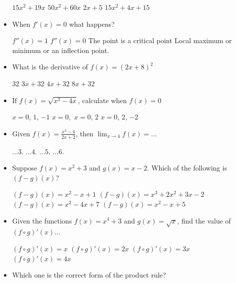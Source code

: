 \documentclass{exam}
\begin{document}
\begin{itemize}
	\begin{choices}
		\choice $15 x^{2} + 19 x$
		\choice $50 x^{2} + 60 x$
		\choice $2 x + 5$
		\CorrectChoice $15 x^{2} + 4 x + 15$
	\end{choices}
	\item When $f'(x) = 0$ what happens?

	\begin{choices}
		\choice $f''(x) = 1$
		\choice $f''(x) = 0 $
		\CorrectChoice The point is a critical  point
		\choice Local maximum or minimum or an inflection point.
	\end{choices}
	\item What is the derivative of $f(x) = (2x+8)^2$

	\begin{choices}
		\choice $32$
		\choice $3x+32$
		\choice $4x+32$
		\CorrectChoice $8x+32$
	\end{choices}

	\item If $f(x) =\sqrt{x^3 - 4x}$, calculate when $f(x)=0 $

	\begin{choices}
		\choice $x = 0,\,1,\,{-1}$
		\choice $x= 0, $
		\choice $x= 0,\,2 $
		\CorrectChoice$ x= 0,\,2,\,{-2} $
	\end{choices}
	\item Given $f(x) = \frac{x^3-4}{2x+2}$, then $\lim_{x\to 4} f(x) = \ldots$

	\begin{choices}
		\choice $\ldots3.$
		\choice $\ldots4.$
		\choice $\ldots5.$
		\CorrectChoice $\ldots6.$
	\end{choices}
	\item  Suppose $f(x) = x^2 + 3$  and $g(x) = x - 2$. Which of the following is  $(f-g)(x)$?

	\begin{choices}
		\choice  $(f-g)(x)=x^2 - x +1$
     	\choice  $(f-g)(x)=x^3 + 2x^2 + 3x -2$
		\choice  $(f-g)(x)=x^2 - 4x + 7$
		\CorrectChoice   $(f-g)(x)=x^2 - x + 5$
	\end{choices}

	\item Given the functions $f(x) = x^4+3$ and $g(x) = \sqrt{x}$, find the value of $(f\circ g)'(x)\ldots$

	\begin{choices}
		\choice $(f\circ g)'(x) = x$
		\CorrectChoice $(f\circ g)'(x) = 2x$
		\choice $(f\circ g)'(x) = 3x$
		\choice $(f\circ g)'(x) = 4x$
	\end{choices}
	\item Which one is the correct form of the product rule?


\end{itemize}
\end{document}

